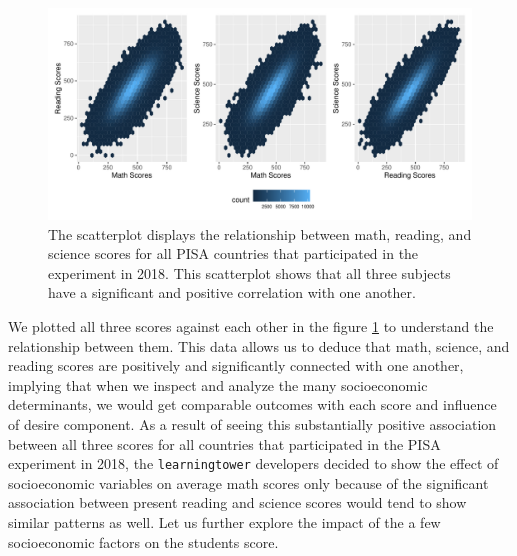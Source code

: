 \begin{Schunk}
\begin{figure}[H]
\includegraphics[width=1\linewidth]{learningtower_files/figure-latex/corr-plot-1} \caption[The scatterplot displays the relationship between math, reading, and science scores for all PISA countries that participated in the experiment in 2018]{The scatterplot displays the relationship between math, reading, and science scores for all PISA countries that participated in the experiment in 2018. This scatterplot shows that all three subjects have a significant and positive correlation with one another.}\label{fig:corr-plot}
\end{figure}
\end{Schunk}

We plotted all three scores against each other in the figure
\ref{fig:corr-plot} to understand the relationship between them. This
data allows us to deduce that math, science, and reading scores are
positively and significantly connected with one another, implying that
when we inspect and analyze the many socioeconomic determinants, we
would get comparable outcomes with each score and influence of desire
component. As a result of seeing this substantially positive association
between all three scores for all countries that participated in the PISA
experiment in 2018, the \texttt{learningtower} developers decided to
show the effect of socioeconomic variables on average math scores only
because of the significant association between present reading and
science scores would tend to show similar patterns as well. Let us
further explore the impact of the a few socioeconomic factors on the
students score.

